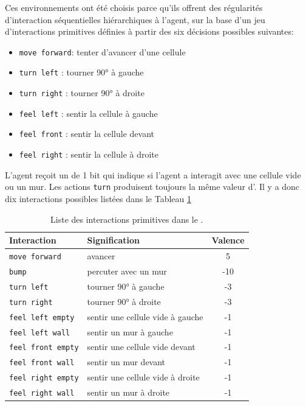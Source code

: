 Ces environnements ont été choisis parce qu'ils offrent des régularités d'interaction séquentielles hiérarchiques à l'agent, sur la base d'un jeu d'interactions primitives définies à partir des six décisions possibles suivantes: 

\begin{itemize}[label=\scalebox{.85}{$\diamond$}]
	\item \texttt{move forward}: tenter d'avancer d'une cellule
	\item \texttt{turn left} : tourner 90° à gauche
	\item \texttt{turn right} : tourner 90° à droite
	\item \texttt{feel left} : sentir la cellule à gauche
	\item \texttt{feel front} : sentir la cellule devant
	\item \texttt{feel right} : sentir la cellule à droite
\end{itemize}

L'agent reçoit un  de 1 bit qui indique si l'agent a interagit avec une cellule vide ou un mur.
Les actions \texttt{turn} produisent toujours la même valeur d'.
Il y a donc dix interactions possibles listées dans le Tableau \ref{tab:small_loop}

\begin{table}[h!]
	\centering
	\begin{tabular}{|l|l|c|}
		\hline
		\textbf{Interaction} & \textbf{Signification} & \textbf{Valence} \\ \hline
		\texttt{move forward} & avancer & 5 \\ \hline
		\texttt{bump} & percuter avec un mur & -10 \\ \hline
		\texttt{turn left} & tourner 90° à gauche & -3\\ \hline
		\texttt{turn right} & tourner 90° à droite & -3\\ \hline
		\texttt{feel left empty} & sentir une cellule vide à gauche & -1\\ \hline
		\texttt{feel left wall} & sentir un mur à gauche & -1\\ \hline
		\texttt{feel front empty} & sentir une cellule vide devant & -1\\ \hline
		\texttt{feel front wall} & sentir un mur devant & -1\\ \hline
		\texttt{feel right empty} & sentir une cellule vide à droite & -1\\ \hline
		\texttt{feel right wall} & sentir un mur à droite & -1\\ \hline
	\end{tabular}
	\caption{Liste des interactions primitives dans le .}
	\label{tab:small_loop}
\end{table}


